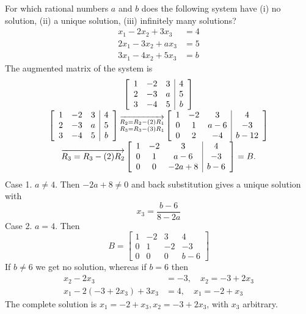 \documentclass[../main.tex]{subfiles}
\begin{document}
\begin{example} For which rational numbers $a$ and $b$ does the following system have (i) no solution, (ii) a unique solution, (iii) infinitely many solutions?
$$
\begin{aligned}
x_{1}-2 x_{2}+3 x_{3}&=4 \\
2 x_{1}-3 x_{2}+a x_{3}&=5 \\
3 x_{1}-4 x_{2}+5 x_{3}&=b
\end{aligned}
$$
The augmented matrix of the system is
$$
\begin{array}{c}
	\left[\begin{array}{ccc|c}
		1 & -2 & 3 & 4 \\
		2 & -3 & a & 5 \\
		3 & -4 & 5 & b
	\end{array}\right]\\
	\left[\begin{array}{ccc|c}
		1 & -2 & 3 & 4 \\
		2 & -3 & a & 5 \\
		3 & -4 & 5 & b
	\end{array}\right]
	\overrightarrow{\begin{subarray}{l} R_{2}=R_{2}-(2) R_{1} \\R_{3}=R_{3}-(3) R_{1} \end{subarray}}
	\left[\begin{array}{ccc|c}
		1 & -2 & 3 & 4 \\
		0 &  1 & a-6 & -3 \\
		0 &  2 & -4 & b-12
	\end{array}\right]\\
	\overrightarrow{R_{3}=R_{3}-(2) R_{2}}
	\left[\begin{array}{ccc|c}
	1 & -2 & 3 & 4 \\
	0 &  1 & a-6 & -3 \\
	0 &  0 & -2a+8 & b-6
	\end{array}\right]
	= B.
\end{array}
$$
Case 1. $a \neq 4$. Then $-2 a+8 \neq 0$ and back substitution gives a unique solution with
$$
x_{3}=\frac{b-6}{8-2 a}
$$
Case 2. $a=4$. Then
$$
B=\left[\begin{array}{ccc|c}
1 & -2 & 3 & 4 \\
0 & 1 & -2 & -3 \\
0 & 0 & 0 & b-6
\end{array}\right]
$$
If $b \neq 6$ we get no solution, whereas if $b=6$ then
$$
\begin{aligned}
x_{2}-2 x_{3} &=-3, \quad x_{2}=-3+2 x_{3} \\
x_{1}-2\left(-3+2 x_{3}\right)+3 x_{3} &=4, \quad x_{1}=-2+x_{3}
\end{aligned}
$$
The complete solution is
$x_{1}=-2+x_{3}, x_{2}=-3+2 x_{3}$, with $x_{3}$ arbitrary.
\end{example}
\end{document}
